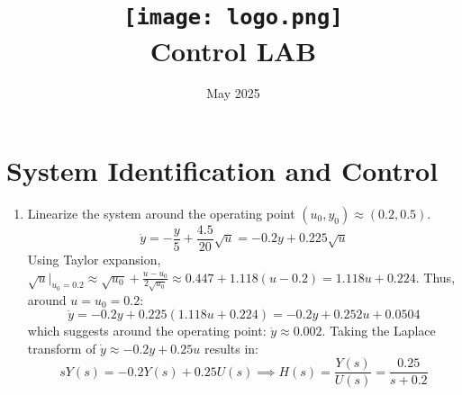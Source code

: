 \documentclass{article}
\title{
  \vspace{-2em}
  \texttt{[image: logo.png]} \\
  \vspace{0.5em}
  Control LAB \\
  \exerciseset
}
\author{\FirstAuthor} %
\date{May 2025}
\begin{document}
\maketitle

\section{System Identification and Control}
\begin{enumerate}
  \item Linearize the system around the operating point $(u_0,y_0)\approx(0.2,0.5)$.
  \begin{equation*}
    \dot{y} = -\frac{y}{5} + \frac{4.5}{20}\sqrt{u} = -0.2 y + 0.225 \sqrt{u}
  \end{equation*}
  Using Taylor expansion, $\sqrt{u}|_{u_0=0.2} \approx \sqrt{u_0} + \frac{u-u_0}{2\sqrt{u_0}} \approx 0.447 + 1.118(u-0.2) = 1.118u + 0.224$. Thus, around $u=u_0=0.2$:
  \begin{equation*}
    \dot{y} = -0.2y + 0.225(1.118u + 0.224) = -0.2y + 0.252u + 0.0504
  \end{equation*}
  which suggests around the operating point: $\dot{y} \approx 0.002$. Taking the Laplace transform of $\dot{y} \approx -0.2y + 0.25u$ results in:
  \begin{equation*}
    sY(s) = -0.2Y(s) + 0.25 U(s) \implies H(s) = \frac{Y(s)}{U(s)} = \frac{0.25}{s + 0.2}
  \end{equation*}


\end{enumerate}
\end{document}
